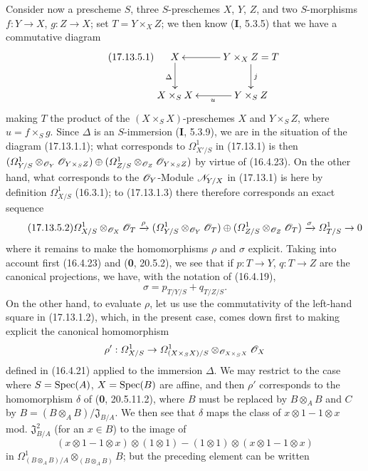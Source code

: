 \begin{env}[17.13.5]
\label{IV.17.13.5}
Consider now a prescheme $S$, three $S$-preschemes $X$, $Y$, $Z$, and two $S$-morphisms $f:Y\to X$, $g:Z\to X$; set $T=Y\times_XZ$; we then know (\textbf{I}, 5.3.5) that we have a commutative diagram
\[
\label{IV.17.13.5.1}
\tag{17.13.5.1}
\xymatrix{
  X \ar[d]_{\Delta} & Y\times_X Z=T \ar[l] \ar[d]^{j}\\
  X\times_S X & Y\times_S Z \ar[l]^{u}
}
\]
making $T$ the product of the $(X\times_SX)$-preschemes $X$ and $Y\times_SZ$, where $u=f\times_Sg$. Since $\Delta$ is an $S$-immersion (\textbf{I}, 5.3.9), we are in the situation of the diagram (17.13.1.1); what corresponds to $\varOmega^1_{X'/S}$ in (17.13.1) is then $(\varOmega^1_{Y/S}\otimes_{\mathscr{O}_Y}\mathscr{O}_{Y\times_SZ})\oplus(\varOmega^1_{Z/S}\otimes_{\mathscr{O}_Z}\mathscr{O}_{Y\times_SZ})$ by virtue of (16.4.23). On the other hand, what corresponds to the $\mathscr{O}_Y$-Module $\mathscr{N}_{Y/X}$ in (17.13.1) is here by definition $\varOmega^1_{X/S}$ (16.3.1); to (17.13.1.3) there therefore corresponds an exact sequence
\[
\label{IV.17.13.5.2}
\tag{17.13.5.2}
\varOmega^1_{X/S}\otimes_{\mathscr{O}_X}\mathscr{O}_T\xrightarrow{\rho}
(\varOmega^1_{Y/S}\otimes_{\mathscr{O}_Y}\mathscr{O}_T)\oplus
(\varOmega^1_{Z/S}\otimes_{\mathscr{O}_Z}\mathscr{O}_T)
\xrightarrow{\sigma}\varOmega^1_{T/S}\to0
\]
where it remains to make the homomorphisms $\rho$ and $\sigma$ explicit. Taking into account first (16.4.23) and (\textbf{0}, 20.5.2), we see that if $p:T\to Y$, $q:T\to Z$ are the canonical projections, we have, with the notation of (16.4.19),
\[
\label{IV.17.13.5.3}
\tag{17.13.5.3}
\sigma=p_{T/Y/S}+q_{T/Z/S}.
\]
On the other hand, to evaluate $\rho$, let us use the commutativity of the left-hand square in (17.13.1.2), which, in the present case, comes down first to making explicit the canonical homomorphism
\[
\rho':\varOmega^1_{X/S}\to\varOmega^1_{(X\times_SX)/S}\otimes_{\mathscr{O}_{X\times_SX}}\mathscr{O}_X
\]
defined in (16.4.21) applied to the immersion $\Delta$. We may restrict to the case where $S=\operatorname{Spec}(A)$, $X=\operatorname{Spec}(B)$ are affine, and then $\rho'$ corresponds to the homomorphism $\delta$ of (\textbf{0}, 20.5.11.2), where $B$ must be replaced by $B\otimes_AB$ and $C$ by $B=(B\otimes_AB)/\mathfrak J_{B/A}$. We then see that $\delta$ maps the class of $x\otimes1-1\otimes x$ mod. $\mathfrak J_{B/A}^2$ (for an $x\in B$) to the image of
\[
(x\otimes1-1\otimes x)\otimes(1\otimes1)-(1\otimes1)\otimes(x\otimes1-1\otimes x)
\]
in $\Omega^1_{(B\otimes_AB)/A}\otimes_{(B\otimes_AB)}B$; but the preceding element can be written
\[
\begin{split}

\end{split}\]
\end{env}
